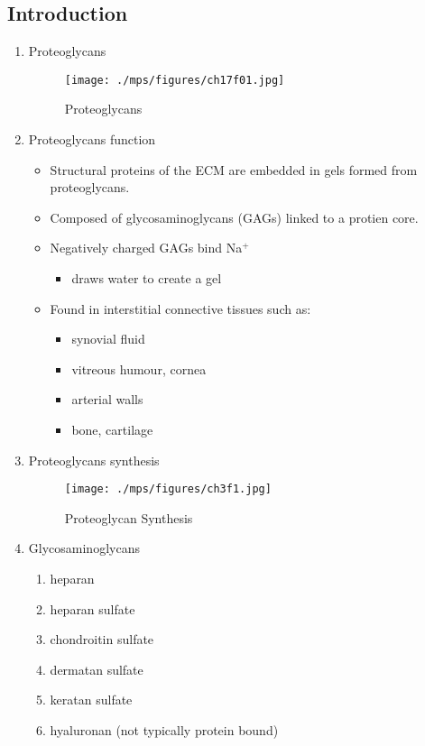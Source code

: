 \documentclass{scrartcl}
\begin{document}
\subsection{Introduction}
\label{sec:org075fa6d}
\begin{enumerate}
\item Proteoglycans
\label{sec:org94fcc3c}

\begin{figure}[htbp]
\centering
\texttt{[image: ./mps/figures/ch17f01.jpg]}
\caption[Proteoglycans]{\label{fig:org1492c59}
Proteoglycans}
\end{figure}

\item Proteoglycans function
\label{sec:org6618c59}

\begin{itemize}
\item Structural proteins of the ECM are embedded in gels formed from
proteoglycans.
\item Composed of glycosaminoglycans (GAGs) linked to a protien core.
\item Negatively charged GAGs bind Na\(^{\text{+}}\)
\begin{itemize}
\item draws water to create a gel
\end{itemize}
\item Found in interstitial connective tissues such as: 
\begin{itemize}
\item synovial fluid
\item vitreous humour, cornea
\item arterial walls
\item bone, cartilage
\end{itemize}
\end{itemize}

\item Proteoglycans synthesis
\label{sec:org5dc15a7}

\begin{figure}[htbp]
\centering
\texttt{[image: ./mps/figures/ch3f1.jpg]}
\caption[Proteoglycan Synthesis]{\label{fig:orgc86cccf}
Proteoglycan Synthesis}
\end{figure}


\item Glycosaminoglycans
\label{sec:org4221d07}

\begin{enumerate}
\item heparan
\item heparan sulfate
\item chondroitin sulfate
\item dermatan sulfate
\item keratan sulfate
\item hyaluronan (not typically protein bound)
\end{enumerate}



\end{enumerate}
\end{document}
